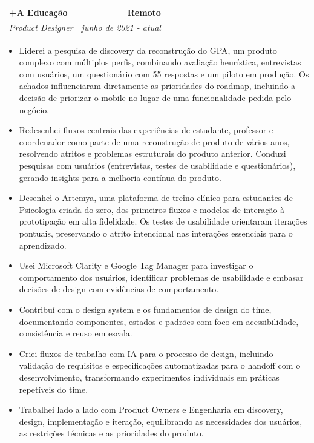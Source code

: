 \documentclass[a4paper,10pt]{article}
\makeatletter
\newcommand{\entry}[4]{%
  \begin{tabularx}{\textwidth}{@{}X r@{}}

    \textbf{\large #1} & \textbf{\large #2} \\
    \textit{#3} & \textit{#4} \\
  \end{tabularx}\vspace{1pt}}
\newenvironment{items}{\begin{itemize}[leftmargin=26pt,itemsep=3pt,parsep=0pt,topsep=0pt,partopsep=0pt,label=\textbullet]}{\end{itemize}\vspace{8pt}}
\makeatother
\begin{document}
\entry{+A Educação}{Remoto}{Product Designer}{junho de 2021 - atual}
\begin{items}
  \item Liderei a pesquisa de discovery da reconstrução do GPA, um produto complexo com múltiplos perfis, combinando avaliação heurística, entrevistas com usuários, um questionário com 55 respostas e um piloto em produção. Os achados influenciaram diretamente as prioridades do roadmap, incluindo a decisão de priorizar o mobile no lugar de uma funcionalidade pedida pelo negócio.
  \item Redesenhei fluxos centrais das experiências de estudante, professor e coordenador como parte de uma reconstrução de produto de vários anos, resolvendo atritos e problemas estruturais do produto anterior. Conduzi pesquisas com usuários (entrevistas, testes de usabilidade e questionários), gerando insights para a melhoria contínua do produto.
  \item Desenhei o Artemya, uma plataforma de treino clínico para estudantes de Psicologia criada do zero, dos primeiros fluxos e modelos de interação à prototipação em alta fidelidade. Os testes de usabilidade orientaram iterações pontuais, preservando o atrito intencional nas interações essenciais para o aprendizado.
  \item Usei Microsoft Clarity e Google Tag Manager para investigar o comportamento dos usuários, identificar problemas de usabilidade e embasar decisões de design com evidências de comportamento.
  \item Contribuí com o design system e os fundamentos de design do time, documentando componentes, estados e padrões com foco em acessibilidade, consistência e reuso em escala.
  \item Criei fluxos de trabalho com IA para o processo de design, incluindo validação de requisitos e especificações automatizadas para o handoff com o desenvolvimento, transformando experimentos individuais em práticas repetíveis do time.
  \item Trabalhei lado a lado com Product Owners e Engenharia em discovery, design, implementação e iteração, equilibrando as necessidades dos usuários, as restrições técnicas e as prioridades do produto.
\end{items}
\end{document}

